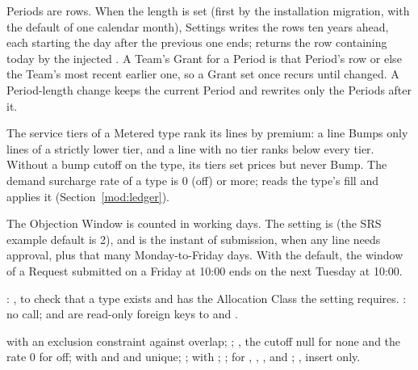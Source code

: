 Periods are rows. When the length is set (first by the installation migration, with the default of one calendar month), Settings writes the  rows ten years ahead, each starting the day after the previous one ends;  returns the row containing today by the injected . A Team's Grant for a Period is that Period's  row or else the Team's most recent earlier one, so a Grant set once recurs until changed. A Period-length change keeps the current Period and rewrites only the Periods after it.

The service tiers of a Metered type rank its lines by premium: a line Bumps only lines of a strictly lower tier, and a line with no tier ranks below every tier. Without a bump cutoff on the type, its tiers set prices but never Bump. The demand surcharge rate of a type is 0 (off) or more;  reads the type's fill and  applies it (Section~\ref{mod:ledger}).

The Objection Window is counted in working days. The setting is  (the SRS example default is 2), and  is the instant of submission, when any line needs approval, plus that many Monday-to-Friday days. With the default, the window of a Request submitted on a Friday at 10:00 ends on the next Tuesday at 10:00.

: , to check that a type exists and has the Allocation Class the setting requires. : no call;  and  are read-only foreign keys to  and .

{\raggedright{} with an exclusion constraint against overlap; ; , the cutoff null for none and the rate 0 for off;  with  and  and  unique; ;  with ; ;  for , , , and ; , insert only.\par}

